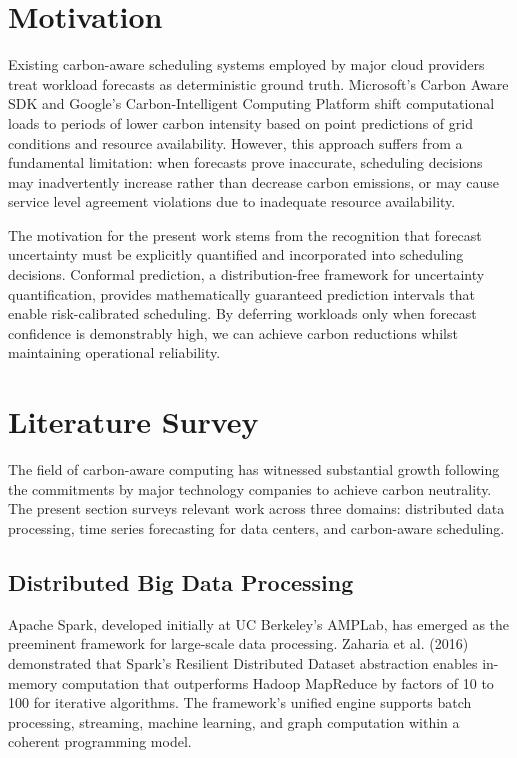 \documentclass[12pt]{report}
\begin{document}
\section{Motivation}

Existing carbon-aware scheduling systems employed by major cloud providers treat workload forecasts as deterministic ground truth. Microsoft's Carbon Aware SDK and Google's Carbon-Intelligent Computing Platform shift computational loads to periods of lower carbon intensity based on point predictions of grid conditions and resource availability. However, this approach suffers from a fundamental limitation: when forecasts prove inaccurate, scheduling decisions may inadvertently increase rather than decrease carbon emissions, or may cause service level agreement violations due to inadequate resource availability.

The motivation for the present work stems from the recognition that forecast uncertainty must be explicitly quantified and incorporated into scheduling decisions. Conformal prediction, a distribution-free framework for uncertainty quantification, provides mathematically guaranteed prediction intervals that enable risk-calibrated scheduling. By deferring workloads only when forecast confidence is demonstrably high, we can achieve carbon reductions whilst maintaining operational reliability.

\section{Literature Survey}

The field of carbon-aware computing has witnessed substantial growth following the commitments by major technology companies to achieve carbon neutrality. The present section surveys relevant work across three domains: distributed data processing, time series forecasting for data centers, and carbon-aware scheduling.

\subsection{Distributed Big Data Processing}

Apache Spark, developed initially at UC Berkeley's AMPLab, has emerged as the preeminent framework for large-scale data processing. Zaharia et al. (2016) demonstrated that Spark's Resilient Distributed Dataset abstraction enables in-memory computation that outperforms Hadoop MapReduce by factors of 10 to 100 for iterative algorithms. The framework's unified engine supports batch processing, streaming, machine learning, and graph computation within a coherent programming model.
\end{document}
